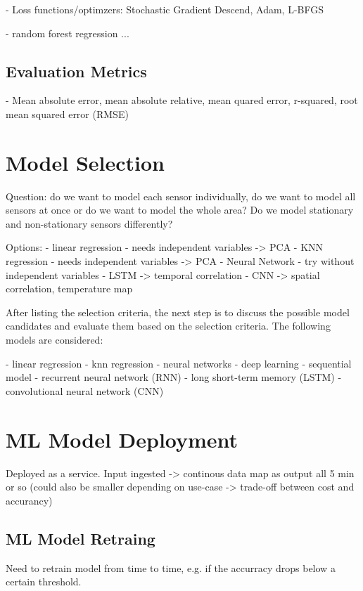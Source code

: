 - Loss functions/optimzers: Stochastic Gradient Descend, Adam, L-BFGS


- random forest regression
...

\subsection{Evaluation Metrics}
\label{subsec:evaluation_metrics}

- Mean absolute error, mean absolute relative, mean quared error, r-squared, root mean squared error (RMSE)

\section{Model Selection}

Question: do we want to model each sensor individually, do we want to model all sensors at once or do we want to model the whole area?
Do we model stationary and non-stationary sensors differently?

Options:
- linear regression
    - needs independent variables -> PCA
- KNN regression
    - needs independent variables -> PCA
- Neural Network
    - try without independent variables
    - LSTM -> temporal correlation
    - CNN -> spatial correlation, temperature map

After listing the selection criteria, the next step is to discuss the possible model candidates and evaluate them based on the selection criteria. The following models are considered:

- linear regression
- knn regression
- neural networks
    - deep learning
        - sequential model
        - recurrent neural network (RNN)
        - long short-term memory (LSTM)
        - convolutional neural network (CNN)


\section{ML Model Deployment}
Deployed as a service. Input ingested -> continous data map as output all 5 min or so (could also be smaller depending on use-case -> trade-off between cost and accurancy)

\subsection{ML Model Retraing}
Need to retrain model from time to time, e.g. if the accurracy drops below a certain threshold.


